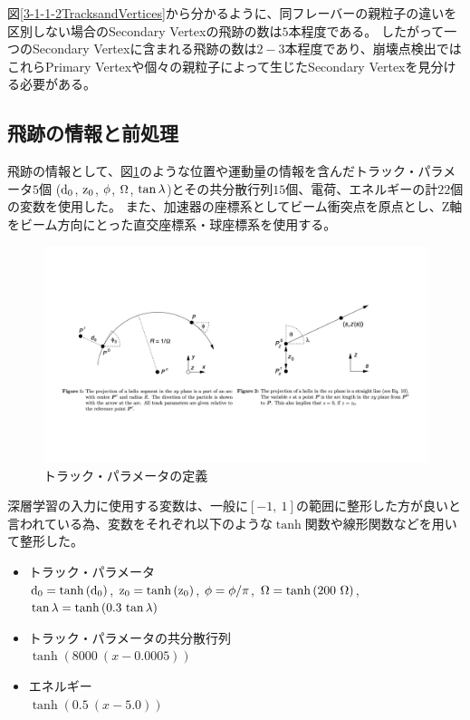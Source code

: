 図\ref{3-1-1-2TracksandVertices}から分かるように、同フレーバーの親粒子の違いを区別しない場合のSecondary Vertexの飛跡の数は$5$本程度である。
したがって一つのSecondary Vertexに含まれる飛跡の数は$2-3$本程度であり、崩壊点検出ではこれらPrimary Vertexや個々の親粒子によって生じたSecondary Vertexを見分ける必要がある。


\subsection{飛跡の情報と前処理} \label{Net:Data:TrackInformationandPreprocessing}

飛跡の情報として、図\ref{3-1-2-1TrackParameters}のような位置や運動量の情報を含んだトラック・パラメータ$5$個 ($\rm d_0$, $\rm z_0$, $\rm \phi$, $\rm \Omega$, $\rm \tan{\lambda}$)\cite{TrackParametersLCIO}とその共分散行列$15$個、電荷、エネルギーの計$22$個の変数を使用した。
また、加速器の座標系としてビーム衝突点を原点とし、Z軸をビーム方向にとった直交座標系・球座標系を使用する。

\begin{figure}[htbp]
 \centering
 \includegraphics[trim = 50 150 50 250, width=1.0\textwidth, clip]{Figure/3Networks/3-1-2-1TrackParameters.png}
 \caption{トラック・パラメータの定義\cite{TrackParametersLCIO}}
 \label{3-1-2-1TrackParameters}
\end{figure}

深層学習の入力に使用する変数は、一般に$[-1,\ 1]$の範囲に整形した方が良いと言われている為、変数をそれぞれ以下のような$\tanh$関数や線形関数などを用いて整形した。

\begin{itemize}
 \item トラック・パラメータ\\
 ${\rm d_0} = \tanh{({\rm d_0})}$,
 ${\rm z_0} = \tanh{({\rm z_0})}$,
 ${\rm \phi} = {\rm \phi}/\pi$,
 ${\rm \Omega} = \tanh{(200\ {\rm \Omega})}$,
 ${\rm \tan{\lambda}} = \tanh{(0.3\ {\rm \tan{\lambda}})}$
 \item トラック・パラメータの共分散行列\\
 $\tanh{(8000\ (x-0.0005))}$
 \item エネルギー\\
 $\tanh{(0.5\ (x-5.0))}$
\end{itemize}

